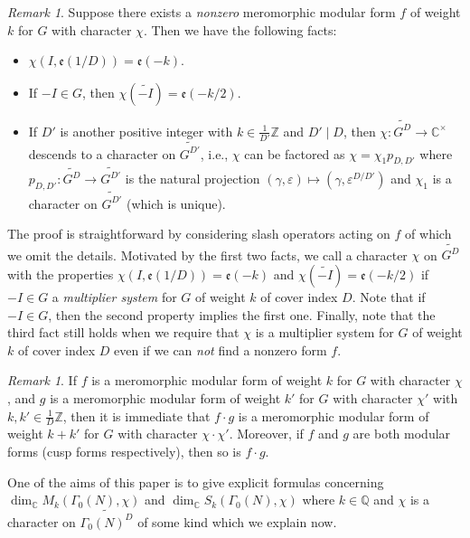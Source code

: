 \documentclass[12pt]{amsart}
\numberwithin{equation}{section}
\theoremstyle{plain}
\theoremstyle{definition}
\theoremstyle{remark}
\newtheorem{rema}[thm]{Remark}
\newcommand\etp[1]{\mathfrak{e}\left(#1\right)}
\newcommand\numZ{\mathbb{Z}}
\newcommand\numQ{\mathbb{Q}}
\newcommand\numC{\mathbb{C}}
\newcommand\Dcover[2]{\widetilde{#1^{#2}}}
\begin{document}
\begin{rema}
\label{rema:mulSysProp}
Suppose there exists a \emph{nonzero} meromorphic modular form $f$ of weight $k$ for $G$ with character $\chi$. Then we have the following facts:
\begin{itemize}
  \item $\chi\left(I,\etp{1/D}\right)=\etp{-k}$.
  \item If $-I\in G$, then $\chi\left(\widetilde{-I}\right)=\etp{-k/2}$.
  \item If $D'$ is another positive integer with $k\in\frac{1}{D'}\numZ$ and $D'\mid D$, then $\chi\colon\Dcover{G}{D}\rightarrow\numC^\times$ descends to a character on $\Dcover{G}{D'}$, i.e., $\chi$ can be factored as $\chi=\chi_1p_{D,D'}$ where $p_{D,D'}\colon\Dcover{G}{D}\rightarrow\Dcover{G}{D'}$ is the natural projection $(\gamma,\varepsilon)\mapsto(\gamma,\varepsilon^{D/D'})$ and $\chi_1$ is a character on $\Dcover{G}{D'}$ (which is unique).
\end{itemize}
The proof is straightforward by considering slash operators acting on $f$ of which we omit the details. Motivated by the first two facts, we call a character $\chi$ on $\Dcover{G}{D}$ with the properties $\chi\left(I,\etp{1/D}\right)=\etp{-k}$ and $\chi\left(\widetilde{-I}\right)=\etp{-k/2}$ if $-I\in G$ a \emph{multiplier system} for $G$ of weight $k$ of cover index $D$. Note that if $-I\in G$, then the second property implies the first one. Finally, note that the third fact still holds when we require that $\chi$ is a multiplier system for $G$ of weight $k$ of cover index $D$ even if we can \emph{not} find a nonzero form $f$.
\end{rema}

\begin{rema}
\label{rema:multiplicationModularForm}
If $f$ is a meromorphic modular form of weight $k$ for $G$ with character $\chi$, and $g$ is a meromorphic modular form of weight $k'$ for $G$ with character $\chi'$ with $k,k'\in\frac{1}{D}\numZ$, then it is immediate that $f\cdot g$ is a meromorphic modular form of weight $k+k'$ for $G$ with character $\chi\cdot\chi'$. Moreover, if $f$ and $g$ are both modular forms (cusp forms respectively), then so is $f\cdot g$. 
\end{rema}

One of the aims of this paper is to give explicit formulas concerning $\dim_\numC M_k(\Gamma_0(N),\chi)$ and $\dim_\numC S_k(\Gamma_0(N),\chi)$ where $k\in\numQ$ and $\chi$ is a character on $\Dcover{\Gamma_0(N)}{D}$ of some kind which we explain now.
\end{document}
